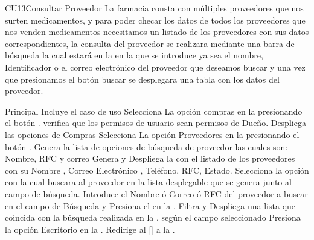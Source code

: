\begin{UseCase}{CU13}{Consultar Proveedor}{
		La farmacia consta con múltiples proveedores que nos surten medicamentos,  y para poder checar los datos de todos los proveedores que nos venden medicamentos necesitamos un listado de los proveedores con sus datos correspondientes, la consulta del proveedor se realizara mediante una barra de búsqueda la cual estará en la   en la que se introduce ya sea el nombre, Identificador o el correo electrónico del proveedor que deseamos buscar y una vez que presionamos el botón buscar se desplegara una tabla con los datos del proveedor.
	}
	\end{UseCase}
	\begin{UCtrayectoria}{Principal}
		\UCpaso Incluye el caso de uso 
		\UCpaso[\UCactor] Selecciona La opción compras en la  presionando el botón .
		\UCpaso verifica que los permisos de usuario sean permisos de Dueño. 
		\UCpaso Despliega las opciones de Compras  
		\UCpaso [\UCactor] Selecciona La opción Proveedores en la  presionando el botón .
		\UCpaso Genera la lista de opciones de búsqueda de proveedor las cuales son: Nombre, RFC y correo
		\UCpaso Genera y Despliega la  con el listado de los proveedores con su Nombre , Correo Electrónico , Teléfono, RFC, Estado.
		\UCpaso[\UCactor] Selecciona la opción con la cual buscara al proveedor en la lista desplegable que se genera junto al campo de búsqueda.
		\UCpaso[\UCactor] Introduce el Nombre ó Correo ó RFC del proveedor a buscar en el campo de Búsqueda y Presiona el  en la .
		\UCpaso Filtra y Despliega una lista que coincida con la búsqueda realizada en la . según el campo seleccionado 
		\UCpaso [\UCactor] Presiona la opción Escritorio en la .
		\UCpaso Redirige al [\UCactor] a la  .
	\end{UCtrayectoria}

